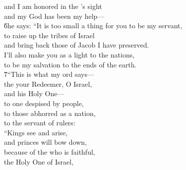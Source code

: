 \begin{poetry}
\poeml and I am honored in the 's sight \\
\poemll    and my God has been my help--- \\
\poeml \v{6}he says: ``It is too small a thing for you to be my servant, \\
\poemll    to raise up the tribes of Israel \\
\poemlll       and bring back those of Jacob I have preserved. \\
\poeml I'll also make you as a light to the nations, \\
\poemll    to be my salvation to the ends of the earth. \\
\poeml \v{7}``This is what my  ord says--- \\
\poemll    the  your Redeemer, O Israel, \\
\poemlll       and his Holy One--- \\
\poeml to one despised by people, \\
\poemll    to those abhorred as a nation, \\
\poemlll       to the servant of rulers: \\
\poeml ``Kings see and arise, \\
\poemll    and princes will bow down, \\
\poeml because of the  who is faithful, \\
\poemll    the Holy One of Israel, \\

\end{poetry}
